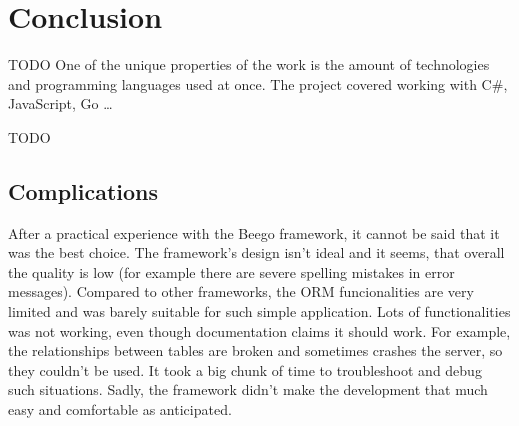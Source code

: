 \chapter{Conclusion}

{TODO} One of the unique properties of the work is the amount of technologies
and programming languages used at once. The project covered working with
C\#, JavaScript, Go …​


{TODO}


\hypertarget{x-complications}{\section{Complications}}
After a practical experience with the Beego framework, it cannot be said that
it was the best choice. The framework’s design isn’t ideal and it seems, that
overall the quality is low (for example there are severe spelling mistakes in
error messages). Compared to other frameworks, the ORM funcionalities are very
limited and was barely suitable for such simple application. Lots of
functionalities was not working, even though documentation claims it should
work. For example, the relationships between tables are broken and sometimes
crashes the server, so they couldn’t be used. It took a big chunk of time
to troubleshoot and debug such situations. Sadly, the framework didn’t make
the development that much easy and comfortable as anticipated.

